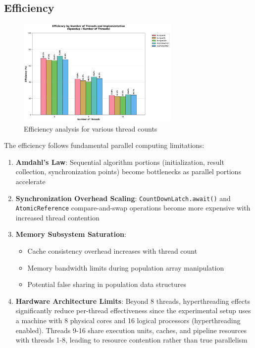 \newpage

\subsection{Efficiency}

\begin{figure}[htbp]
   \centering
   \includegraphics[width=0.7\textwidth]{images/efficiency_analysis.png}
   \caption{Efficiency analysis for various thread counts}
   \label{fig:efficiency}
\end{figure}

The efficiency follows fundamental parallel computing limitations:

\begin{enumerate}
   \item \textbf{Amdahl's Law}: Sequential algorithm portions (initialization,
   result collection, synchronization points) become bottlenecks as parallel
   portions accelerate
   \item \textbf{Synchronization Overhead Scaling}:
   \texttt{CountDownLatch.await()} and \texttt{AtomicReference} compare-and-swap
   operations become more expensive with increased thread contention
   \item \textbf{Memory Subsystem Saturation}:
      \begin{itemize}
      \item Cache consistency overhead increases with thread count
      \item Memory bandwidth limits during population array manipulation
      \item Potential false sharing in population data structures
      \end{itemize}
   \item \textbf{Hardware Architecture Limits}: Beyond 8 threads, hyperthreading
   effects significantly reduce per-thread effectiveness since the experimental
   setup uses a machine with 8 physical cores and 16 logical processors
   (hyperthreading enabled). Threads 9-16 share execution units, caches, and
   pipeline resources with threads 1-8, leading to resource contention rather
   than true parallelism
\end{enumerate}

